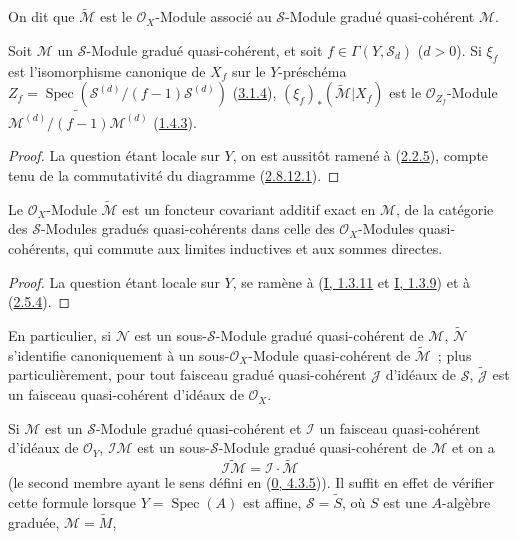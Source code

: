 On dit que $\widetilde{\mathcal{M}}$ est le $\mathcal{O}_X$-Module associé au
$\mathcal{S}$-Module gradué quasi-cohérent $\mathcal{M}$.

\begin{proposition}[3.2.3]
\label{II.3.2.3-fr}
Soit $\mathcal{M}$ un $\mathcal{S}$-Module gradué quasi-cohérent, et soit
$f\in\Gamma(Y,\mathcal{S}_d)$ ($d>0$). Si $\xi_f$ est l'isomorphisme canonique
de $X_f$ sur le $Y$-préschéma
$Z_f=\operatorname{Spec}(\mathcal{S}^{(d)}/(f-1)\mathcal{S}^{(d)})$
(\hyperref[II.3.1.4-fr]{3.1.4}), $(\xi_f)_*(\widetilde{\mathcal{M}}|X_f)$ est
le $\mathcal{O}_{Z_f}$-Module
$\widetilde{\mathcal{M}^{(d)}/(f-1)\mathcal{M}^{(d)}}$
(\hyperref[II.1.4.3-fr]{1.4.3}).
\end{proposition}

\begin{proof}
La question étant locale sur $Y$, on est aussitôt ramené à
(\hyperref[II.2.2.5-fr]{2.2.5}), compte tenu de la commutativité du diagramme
(\hyperref[II.2.8.12.1-fr]{2.8.12.1}).
\end{proof}

\begin{proposition}[3.2.4]
\label{II.3.2.4-fr}
Le $\mathcal{O}_X$-Module $\widetilde{\mathcal{M}}$ est un foncteur covariant
additif exact en $\mathcal{M}$, de la catégorie des $\mathcal{S}$-Modules
gradués quasi-cohérents dans celle des $\mathcal{O}_X$-Modules
quasi-cohérents, qui commute aux limites inductives et aux sommes directes.
\end{proposition}

\begin{proof}
La question étant locale sur $Y$, se ramène à
(\hyperref[I.1.3.11-fr]{I, 1.3.11} et
\hyperref[I.1.3.9-fr]{I, 1.3.9}) et à
(\hyperref[II.2.5.4-fr]{2.5.4}).
\end{proof}

En particulier, si $\mathcal{N}$ est un sous-$\mathcal{S}$-Module gradué
quasi-cohérent de $\mathcal{M}$, $\widetilde{\mathcal{N}}$ s'identifie
canoniquement à un sous-$\mathcal{O}_X$-Module quasi-cohérent de
$\widetilde{\mathcal{M}}$~; plus particulièrement, pour tout faisceau gradué
quasi-cohérent $\mathcal{J}$ d'idéaux de $\mathcal{S}$,
$\widetilde{\mathcal{J}}$ est un faisceau quasi-cohérent d'idéaux de
$\mathcal{O}_X$.

Si $\mathcal{M}$ est un $\mathcal{S}$-Module gradué quasi-cohérent et
$\mathcal{I}$ un faisceau quasi-cohérent d'idéaux de $\mathcal{O}_Y$,
$\mathcal{I}\mathcal{M}$ est un sous-$\mathcal{S}$-Module gradué
quasi-cohérent de $\mathcal{M}$ et on a
\[
\label{II.3.2.4.1-fr}
  \widetilde{\mathcal{I}\mathcal{M}}
  =\mathcal{I}\cdot\widetilde{\mathcal{M}}
\tag{3.2.4.1}
\]
(le second membre ayant le sens défini en
(\hyperref[0.4.3.5-fr]{0, 4.3.5})). Il suffit en effet de vérifier cette
formule lorsque $Y=\operatorname{Spec}(A)$ est affine,
$\mathcal{S}=\widetilde{S}$, où $S$ est une $A$-algèbre graduée,
$\mathcal{M}=\widetilde{M}$,

